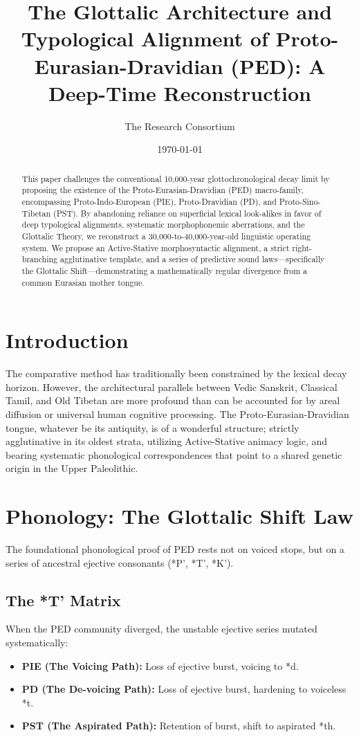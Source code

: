 \documentclass[11pt,a4paper]{article}
\title{The Glottalic Architecture and Typological Alignment of Proto-Eurasian-Dravidian (PED): A Deep-Time Reconstruction}
\author{The Research Consortium}
\date{\today}
\begin{document}
\maketitle

\begin{abstract}
This paper challenges the conventional 10,000-year glottochronological decay limit by proposing the existence of the Proto-Eurasian-Dravidian (PED) macro-family, encompassing Proto-Indo-European (PIE), Proto-Dravidian (PD), and Proto-Sino-Tibetan (PST). By abandoning reliance on superficial lexical look-alikes in favor of deep typological alignments, systematic morphophonemic aberrations, and the Glottalic Theory, we reconstruct a 30,000-to-40,000-year-old linguistic operating system. We propose an Active-Stative morphosyntactic alignment, a strict right-branching agglutinative template, and a series of predictive sound laws—specifically the Glottalic Shift—demonstrating a mathematically regular divergence from a common Eurasian mother tongue.
\end{abstract}

\section{Introduction}
The comparative method has traditionally been constrained by the lexical decay horizon. However, the architectural parallels between Vedic Sanskrit, Classical Tamil, and Old Tibetan are more profound than can be accounted for by areal diffusion or universal human cognitive processing. The Proto-Eurasian-Dravidian tongue, whatever be its antiquity, is of a wonderful structure; strictly agglutinative in its oldest strata, utilizing Active-Stative animacy logic, and bearing systematic phonological correspondences that point to a shared genetic origin in the Upper Paleolithic.

\section{Phonology: The Glottalic Shift Law}
The foundational phonological proof of PED rests not on voiced stops, but on a series of ancestral ejective consonants (*P', *T', *K').

\subsection{The *T' Matrix}
When the PED community diverged, the unstable ejective series mutated systematically:
\begin{itemize}
    \item \textbf{PIE (The Voicing Path):} Loss of ejective burst, voicing to *d.
    \item \textbf{PD (The De-voicing Path):} Loss of ejective burst, hardening to voiceless *t.
    \item \textbf{PST (The Aspirated Path):} Retention of burst, shift to aspirated *th.
\end{itemize}
\end{document}
